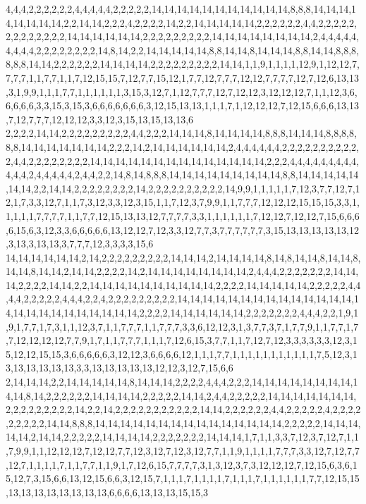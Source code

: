 4,4,4,2,2,2,2,2,2,4,4,4,4,4,2,2,2,2,2,14,14,14,14,14,14,14,14,14,14,14,8,8,8,14,14,14,14,14,14,14,14,2,2,14,14,2,2,2,4,2,2,2,2,14,2,2,14,14,14,14,14,2,2,2,2,2,2,4,4,2,2,2,2,2,2,2,2,2,2,2,2,2,14,14,14,14,14,14,2,2,2,2,2,2,2,2,2,14,14,14,14,14,14,14,14,2,4,4,4,4,4,4,4,4,4,2,2,2,2,2,2,2,2,14,8,14,2,2,14,14,14,14,14,8,8,14,14,8,14,14,14,8,8,14,14,8,8,8,8,8,8,14,14,2,2,2,2,2,2,14,14,14,14,2,2,2,2,2,2,2,2,2,14,14,1,1,9,1,1,1,1,12,9,1,12,12,7,7,7,7,1,1,7,7,1,1,7,12,15,15,7,12,7,7,15,12,1,7,7,12,7,7,7,12,12,7,7,7,7,12,7,12,6,13,13,3,1,9,9,1,1,1,7,7,1,1,1,1,1,1,3,15,3,12,7,1,12,7,7,7,12,7,12,12,3,12,12,12,7,1,1,12,3,6,6,6,6,6,3,3,15,3,15,3,6,6,6,6,6,6,6,3,12,15,13,13,1,1,1,7,1,12,12,12,7,12,15,6,6,6,13,13,7,12,7,7,7,12,12,12,3,3,12,3,15,13,15,13,13,6
2,2,2,2,14,14,2,2,2,2,2,2,2,2,2,4,4,2,2,2,14,14,14,8,14,14,14,14,8,8,8,14,14,14,8,8,8,8,8,8,14,14,14,14,14,14,14,2,2,2,14,2,14,14,14,14,14,14,2,4,4,4,4,4,4,2,2,2,2,2,2,2,2,2,2,2,4,4,2,2,2,2,2,2,2,2,14,14,14,14,14,14,14,14,14,14,14,14,14,14,2,2,2,4,4,4,4,4,4,4,4,4,4,4,4,2,4,4,4,4,4,2,4,4,2,2,14,8,14,8,8,8,14,14,14,14,14,14,14,14,14,8,8,14,14,14,14,14,14,14,2,2,14,14,2,2,2,2,2,2,2,2,14,2,2,2,2,2,2,2,2,2,2,14,9,9,1,1,1,1,1,7,12,3,7,7,12,7,12,1,7,3,3,12,7,1,1,7,3,12,3,3,12,3,15,1,1,7,12,3,7,9,9,1,1,7,7,7,12,12,12,15,15,15,3,3,1,1,1,1,1,7,7,7,7,1,1,7,7,12,15,13,13,12,7,7,7,7,3,3,1,1,1,1,1,1,7,12,12,7,12,12,7,15,6,6,6,6,15,6,3,12,3,3,6,6,6,6,6,13,12,12,7,12,3,3,12,7,7,3,7,7,7,7,7,7,3,15,13,13,13,13,13,12,3,13,3,13,13,3,7,7,7,12,3,3,3,3,15,6
14,14,14,14,14,14,2,14,2,2,2,2,2,2,2,2,2,14,14,14,2,14,14,14,14,8,14,8,14,14,8,14,14,8,14,14,8,14,14,2,14,14,2,2,2,2,14,2,14,14,14,14,14,14,14,14,2,4,4,4,2,2,2,2,2,2,2,14,14,14,2,2,2,2,14,14,2,2,14,14,14,14,14,14,14,14,14,14,2,2,2,2,14,14,14,14,14,2,2,2,2,2,4,4,4,4,2,2,2,2,2,4,4,4,2,2,4,2,2,2,2,2,2,2,2,2,14,14,14,14,14,14,14,14,14,14,14,14,14,14,14,14,14,14,14,14,14,14,14,14,14,2,2,2,2,14,14,14,14,14,14,2,2,2,2,2,2,2,4,4,4,2,2,1,9,1,9,1,7,7,1,7,3,1,1,12,3,7,1,1,7,7,7,1,1,7,7,7,3,3,6,12,12,3,1,3,7,7,3,7,1,7,7,9,1,1,7,7,1,7,7,12,12,12,12,7,7,9,1,7,1,1,7,7,7,1,1,1,7,12,6,15,3,7,7,1,1,7,12,7,12,3,3,3,3,3,3,12,3,15,12,12,15,15,3,6,6,6,6,6,3,12,12,3,6,6,6,6,12,1,1,1,7,7,1,1,1,1,1,1,1,1,1,1,1,7,5,12,3,13,13,13,13,13,13,3,3,13,13,13,13,13,12,12,3,12,7,15,6,6
2,14,14,14,2,2,14,14,14,14,14,8,14,14,14,2,2,2,2,4,4,4,2,2,2,14,14,14,14,14,14,14,14,14,14,8,14,2,2,2,2,2,2,14,14,14,14,2,2,2,2,2,14,14,2,4,4,2,2,2,2,2,14,14,14,14,14,14,14,2,2,2,2,2,2,2,2,2,14,2,2,14,2,2,2,2,2,2,2,2,2,2,2,14,14,2,2,2,2,2,2,4,4,2,2,2,2,2,4,2,2,2,2,2,2,2,2,2,14,14,8,8,8,14,14,14,14,14,14,14,14,14,14,14,14,14,14,14,2,2,2,2,2,14,14,14,14,14,2,14,14,2,2,2,2,2,14,14,14,14,2,2,2,2,2,2,2,14,14,14,1,7,1,1,3,3,7,12,3,7,12,7,1,1,7,9,9,1,1,12,12,12,7,12,12,7,7,12,3,12,7,12,3,12,7,7,1,1,9,1,1,1,1,7,7,7,3,3,12,7,12,7,7,12,7,1,1,1,1,7,1,1,7,7,1,1,9,1,7,12,6,15,7,7,7,7,3,1,3,12,3,7,3,12,12,12,7,12,15,6,3,6,15,12,7,3,15,6,6,13,12,15,6,6,3,12,15,7,1,1,1,7,1,1,1,1,7,1,1,1,7,1,1,1,1,1,1,7,7,12,15,15,13,13,13,13,13,13,13,13,6,6,6,6,13,13,13,15,15,3
